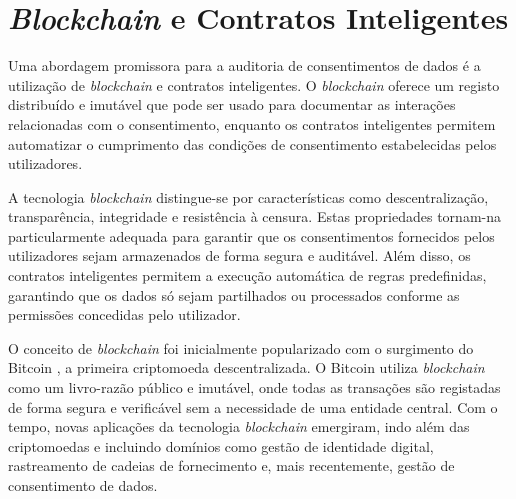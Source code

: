 
\section{\textit{{Blockchain}} e Contratos Inteligentes}

Uma abordagem promissora para a auditoria de consentimentos de dados é a utilização de \textit{blockchain} e contratos inteligentes. O \textit{blockchain} oferece um registo distribuído e imutável que pode ser usado para documentar as interações relacionadas com o consentimento, enquanto os contratos inteligentes permitem automatizar o cumprimento das condições de consentimento estabelecidas pelos utilizadores.

A tecnologia \textit{blockchain} distingue-se por características como descentralização, transparência, integridade e resistência à censura. Estas propriedades tornam-na particularmente adequada para garantir que os consentimentos fornecidos pelos utilizadores sejam armazenados de forma segura e auditável. Além disso, os contratos inteligentes permitem a execução automática de regras predefinidas, garantindo que os dados só sejam partilhados ou processados conforme as permissões concedidas pelo utilizador.

O conceito de \textit{blockchain} foi inicialmente popularizado com o surgimento do Bitcoin \citep{nakamoto2008bitcoin}, a primeira criptomoeda descentralizada. O Bitcoin utiliza \textit{blockchain} como um livro-razão público e imutável, onde todas as transações são registadas de forma segura e verificável sem a necessidade de uma entidade central. Com o tempo, novas aplicações da tecnologia \textit{blockchain} emergiram, indo além das criptomoedas e incluindo domínios como gestão de identidade digital, rastreamento de cadeias de fornecimento e, mais recentemente, gestão de consentimento de dados.

